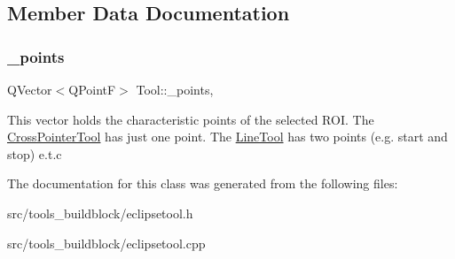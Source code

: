 \subsection{Member Data Documentation}
\mbox{\label{classTool_a68be77a2e364a7b13d7206388ba5843e}} 
\subsubsection{\texorpdfstring{\+\_\+points}{\_points}}
{\footnotesize\ttfamily Q\+Vector$<$Q\+PointF$>$ Tool\+::\+\_\+points\hspace{0.3cm}{\ttfamily [protected]}, {\ttfamily [inherited]}}

This vector holds the characteristic points of the selected R\+OI. The \mbox{\hyperlink{classCrossPointerTool}{Cross\+Pointer\+Tool}} has just one point. The \mbox{\hyperlink{classLineTool}{Line\+Tool}} has two points (e.\+g. start and stop) e.\+t.\+c 

The documentation for this class was generated from the following files\+:\begin{DoxyCompactItemize}
\item 
src/tools\+\_\+buildblock/eclipsetool.\+h\item 
src/tools\+\_\+buildblock/eclipsetool.\+cpp\end{DoxyCompactItemize}
